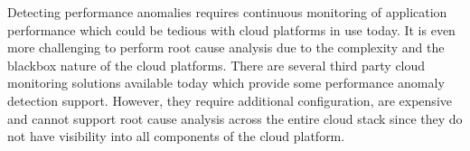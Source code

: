 Detecting performance anomalies
requires continuous monitoring of application performance which could be tedious with
cloud platforms in use today. It is even more challenging to perform root cause analysis
due to the complexity and the blackbox nature of the cloud platforms. There are several
third party cloud monitoring solutions available today which provide some performance
anomaly detection support. However, they require additional configuration, are expensive
and cannot support root cause analysis across the entire cloud stack since they do not
have visibility into all components of the cloud platform.
